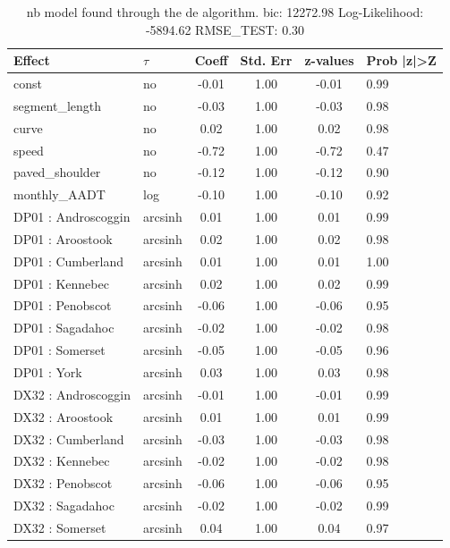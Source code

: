 \begin{table}
	\caption{nb model found through the de algorithm. bic: 12272.98 Log-Likelihood: -5894.62 RMSE_TEST: 0.30}
	\begin{center}
		\begin{tabular}{|l|l|c|c|c|l|}
			\hline
			Effect & $\tau$ & Coeff & Std. Err & z-values & Prob |z|>Z \\
			\hline
			const & no & -0.01 & 1.00 & -0.01 & 0.99 \\
			\hline
			segment_length & no & -0.03 & 1.00 & -0.03 & 0.98 \\
			\hline
			curve & no & 0.02 & 1.00 & 0.02 & 0.98 \\
			\hline
			speed & no & -0.72 & 1.00 & -0.72 & 0.47 \\
			\hline
			paved_shoulder & no & -0.12 & 1.00 & -0.12 & 0.90 \\
			\hline
			monthly_AADT & log & -0.10 & 1.00 & -0.10 & 0.92 \\
			\hline
			DP01 : Androscoggin & arcsinh & 0.01 & 1.00 & 0.01 & 0.99 \\
			\hline
			DP01 : Aroostook & arcsinh & 0.02 & 1.00 & 0.02 & 0.98 \\
			\hline
			DP01 : Cumberland & arcsinh & 0.01 & 1.00 & 0.01 & 1.00 \\
			\hline
			DP01 : Kennebec & arcsinh & 0.02 & 1.00 & 0.02 & 0.99 \\
			\hline
			DP01 : Penobscot & arcsinh & -0.06 & 1.00 & -0.06 & 0.95 \\
			\hline
			DP01 : Sagadahoc & arcsinh & -0.02 & 1.00 & -0.02 & 0.98 \\
			\hline
			DP01 : Somerset & arcsinh & -0.05 & 1.00 & -0.05 & 0.96 \\
			\hline
			DP01 : York & arcsinh & 0.03 & 1.00 & 0.03 & 0.98 \\
			\hline
			DX32 : Androscoggin & arcsinh & -0.01 & 1.00 & -0.01 & 0.99 \\
			\hline
			DX32 : Aroostook & arcsinh & 0.01 & 1.00 & 0.01 & 0.99 \\
			\hline
			DX32 : Cumberland & arcsinh & -0.03 & 1.00 & -0.03 & 0.98 \\
			\hline
			DX32 : Kennebec & arcsinh & -0.02 & 1.00 & -0.02 & 0.98 \\
			\hline
			DX32 : Penobscot & arcsinh & -0.06 & 1.00 & -0.06 & 0.95 \\
			\hline
			DX32 : Sagadahoc & arcsinh & -0.02 & 1.00 & -0.02 & 0.99 \\
			\hline
			DX32 : Somerset & arcsinh & 0.04 & 1.00 & 0.04 & 0.97 \\

\end{tabular}
\end{center}
\end{table}
